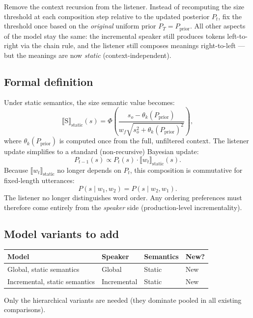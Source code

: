 \documentclass[11pt, a4paper]{article}
\begin{document}
Remove the context recursion from the listener.
Instead of recomputing the size threshold at each composition step relative to the updated posterior $P_t$, fix the threshold once based on the \emph{original} uniform prior $P_T = P_\mathrm{prior}$.
All other aspects of the model stay the same: the incremental speaker still produces tokens left-to-right via the chain rule, and the listener still composes meanings right-to-left --- but the meanings are now \emph{static} (context-independent).

\subsection{Formal definition}

Under static semantics, the size semantic value becomes:
\[
\llbracket \text{S} \rrbracket_\mathrm{static}(s)
= \Phi\!\left(
    \frac{s_o - \theta_k(P_\mathrm{prior})}
         {w_f \sqrt{s_o^2 + \theta_k(P_\mathrm{prior})^2}}
  \right),
\]
where $\theta_k(P_\mathrm{prior})$ is computed once from the full, unfiltered context.
The listener update simplifies to a standard (non-recursive) Bayesian update:
\[
P_{t-1}(s) \propto P_t(s) \cdot \llbracket w_t \rrbracket_\mathrm{static}(s).
\]
Because $\llbracket w_t \rrbracket_\mathrm{static}$ no longer depends on $P_t$, this composition is commutative for fixed-length utterances:
\[
P(s \mid w_1, w_2) = P(s \mid w_2, w_1).
\]
The listener no longer distinguishes word order.
Any ordering preferences must therefore come entirely from the \emph{speaker} side (production-level incrementality).

\subsection{Model variants to add}

\begin{center}
\begin{tabular}{llll}
\toprule
\textbf{Model} & \textbf{Speaker} & \textbf{Semantics} & \textbf{New?} \\
\midrule
Global, static semantics       & Global       & Static & New \\
Incremental, static semantics  & Incremental  & Static & New \\
\bottomrule
\end{tabular}
\end{center}

Only the hierarchical variants are needed (they dominate pooled in all existing comparisons).
\end{document}

